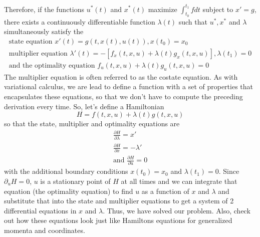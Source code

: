\documentclass[11pt]{article}
\numberwithin{equation}{section}
\begin{document}
Therefore, if the functions $u^*(t)$ and $x^*(t)$ maximize $\int_{t_0}^{t_1}fdt$ subject to $x' = g$, there exists a continuously differentiable function $\lambda(t)$ such that $u^*,x^*$ and $\lambda$ simultaneously satisfy the
\begin{align}
\text{state equation } x'(t) = g(t,x(t),u(t)), x(t_0)= x_0 \\
\text{multiplier equation } \lambda'(t) = -[f_x(t,x,u) + \lambda(t)g_x(t,x,u)], \lambda(t_1) = 0 \\
\text{and the optimality equation } f_u(t,x,u) + \lambda(t)g_u(t,x,u) = 0
\end{align}
The multiplier equation is often referred to as the costate equation. As with variational calculus, we are lead to define a function with a set of properties that encapsulates these equations, so that we don't have to compute the preceding derivation every time. So, let's define a Hamiltonian
\begin{equation}
H = f(t,x,u) + \lambda(t)g(t,x,u)
\end{equation}
so that the state, multiplier and optimality equations are
\begin{align}
\frac{\partial H}{\partial \lambda} = x' \\
\frac{\partial H}{\partial x} = -\lambda' \\
\text{and } \frac{\partial H}{\partial u} = 0
\end{align}
with the additional boundary conditions $x(t_0) = x_0$ and $\lambda(t_1) = 0$. Since $\partial_uH = 0$, $u$ is a stationary point of $H$ at all times and we can integrate that equation (the optimality equation) to find $u$ as a function of $x$ and $\lambda$ and substitute that into the state and multiplier equations to get a system of 2 differential equations in $x$ and $\lambda$. Thus, we have solved our problem. Also, check out how these equations look just like Hamiltons equations for generalized momenta and coordinates.
\end{document}
